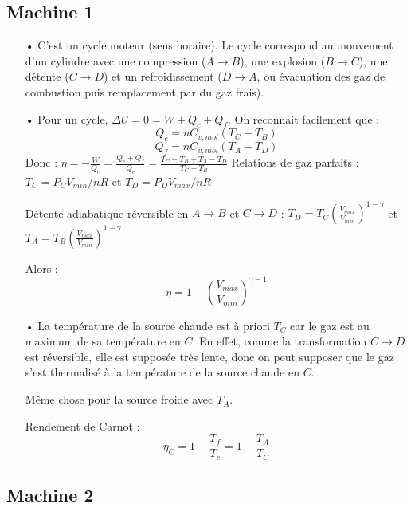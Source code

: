 \documentclass{report}
\begin{document}
\subsection*{Machine 1}
\begin{itemize}
	\item[•] 
C'est un cycle moteur (sens horaire). Le cycle correspond au mouvement d'un cylindre avec une compression ($A\longrightarrow B$), une explosion ($B\longrightarrow C$), une détente  ($C\longrightarrow D$) et un refroidissement ($D\longrightarrow A$, ou évacuation des gaz de combustion puis remplacement par du gaz frais).
	\item[•]
Pour un cycle, $\Delta U = 0 = W + Q_c + Q_f$. On reconnait facilement que :
\begin{equation}
	Q_c = nC_{v,mol}(T_C-T_B)
\end{equation}
\begin{equation}
	Q_f = nC_{v,mol}(T_A-T_D)
\end{equation}
Donc :
$\eta = -\frac{W}{Q_c}=\frac{Q_c +Q_f}{Q_c}=\frac{T_C-T_B + T_A-T_D}{T_C-T_B}$
Relations de gaz parfaits : $T_C=P_CV_{min}/nR$ et $T_D=P_DV_{max}/nR$

Détente adiabatique réversible en $A\longrightarrow B$ et $C\longrightarrow D$ : $T_D = T_C\left( \frac{V_{max}}{V_{min}}\right)^{1-\gamma}$ et $T_A = T_B\left( \frac{V_{max}}{V_{min}}\right)^{1-\gamma}$

Alors :
\begin{equation}
	\eta = 1-\left( \frac{V_{max}}{V_{min}}\right)^{\gamma -1}
\end{equation}
\item[•] La température de la source chaude est à priori $T_C$ car le gaz est au maximum de sa température en $C$. En effet, comme la transformation $C\longrightarrow D$ est réversible, elle est supposée très lente, donc on peut supposer que le gaz s'est thermalisé à la température de la source chaude en $C$. 

Même chose pour la source froide avec $T_A$. 

Rendement de Carnot :
\begin{equation}
	\eta_C = 1-\frac{T_f}{T_c} = 1-\frac{T_A}{T_C}
\end{equation}

\end{itemize}

\subsection*{Machine 2}
\end{document}
